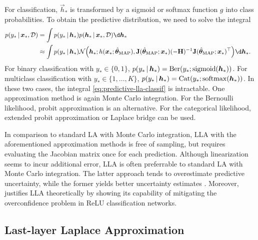 For classification, $\vec{h}_*$ is transformed by a sigmoid or softmax function $g$ into class probabilities. To obtain the predictive distribution, we need to solve the integral
\begin{equation} \label{eq:predictive-lla-classif}
\begin{split}
  p(y_* \given \vec{x}_*, \mathcal{D}) &= \int p(y_* \given \vec{h}_*) p(\vec{h}_* \given \vec{x}_*, \mathcal{D}) \d \vec{h}_* \\
  &\approx \int p(y_* \given \vec{h}_*) \mathcal{N}\mleft( \vec{h}_*;  h(\vec{x}_*; \hat{\vec{\theta}}_\text{MAP}), \mat{J}(\hat{\vec{\theta}}_\text{MAP}; \vec{x}_*) (-\mat{H})^{-1} \mat{J}(\hat{\vec{\theta}}_\text{MAP}; \vec{x}_*)^\T  \mright) \d \vec{h}_*.\;\;\;
\end{split}
\end{equation}
For binary classification with $y_* \in \{0,1\}$, $p(y_* \,|\, \bm{h}_*) = \operatorname{Ber}(y_*; \operatorname{sigmoid}(\bm{h}_*))$. For multiclass classification with $y_* \in \{1, \dots, K\}$, $p(y_* \,|\, \bm{h}_*) = \operatorname{Cat}(y_*; \operatorname{softmax}(\bm{h}_*))$. In these two cases, the integral \eqref{eq:predictive-lla-classif} is intractable. One approximation method is again Monte Carlo integration. For the Bernoulli likelihood, probit approximation \citep{spiegelhalter1990ProbitApprox1,mackay1992ProbitApprox2} is an alternative. For the categorical likelihood, extended probit approximation \citep{gibbs1997ExtendProbit} or Laplace bridge \citep{hobbhahnyLapaceBridge2022a} can be used.

In comparison to standard LA with Monte Carlo integration, LLA with the aforementioned approximation methods is free of sampling, but requires evaluating the Jacobian matrix once for each prediction. Although linearization seems to incur additional error, LLA is often preferrable to standard LA with Monte Carlo integration. The latter approach tends to overestimate predictive uncertainty, while the former yields better uncertainty estimates \cite{immerLLA2021a}. Moreover, \cite{kristiadiABitBayesian2020} justifies LLA theoretically by showing its capability of mitigating the overconfidence problem in ReLU classification networks.

\subsection{Last-layer Laplace Approximation}

